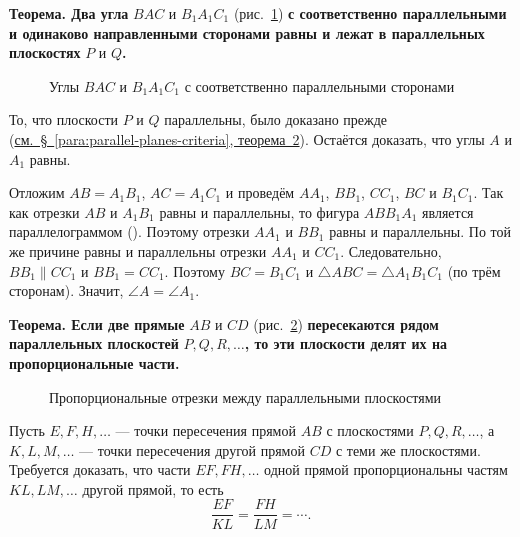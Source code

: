  \textbf{Теорема. Два угла} \(BAC\) и \(B_1A_1C_1\) (рис.~\ref{fig:kiselev-stereo-330}) \textbf{с соответственно параллельными и одинаково направленными сторонами равны и лежат в параллельных плоскостях} \(P\) и \(Q\)\textbf{.}

\begin{figure}[htbp]
    \centering
    \renewcommand{\thefigure}{330}
    \captionsetup{name=Рис.,labelsep=period}
    
    \caption{Углы \(BAC\) и \(B_1A_1C_1\) с соответственно параллельными сторонами}\label{fig:kiselev-stereo-330}
\end{figure}

То, что плоскости \(P\) и \(Q\) параллельны, было доказано прежде (\hyperref[thm:parallel-planes-two-lines]{см.~§~\ref*{para:parallel-planes-criteria}, теорема~2}). Остаётся доказать, что углы \(A\) и \(A_1\) равны.

Отложим \(AB=A_1B_1\), \(AC=A_1C_1\) и проведём \(AA_1\), \(BB_1\), \(CC_1\), \(BC\) и \(B_1C_1\). Так как отрезки \(AB\) и \(A_1B_1\) равны и параллельны, то фигура \(ABB_1A_1\) является параллелограммом (). Поэтому отрезки \(AA_1\) и \(BB_1\) равны и параллельны. По той же причине равны и параллельны отрезки \(AA_1\) и \(CC_1\). Следовательно, \(BB_1\parallel CC_1\) и \(BB_1=CC_1\). Поэтому \(BC=B_1C_1\) и \(\triangle ABC=\triangle A_1B_1C_1\) (по трём сторонам). Значит, \(\angle A=\angle A_1\).

 \textbf{Теорема. Если две прямые} \(AB\) и \(CD\) (рис.~\ref{fig:kiselev-stereo-331}) \textbf{пересекаются рядом параллельных плоскостей} \(P,Q,R,\ldots\)\textbf{, то эти плоскости делят их на пропорциональные части.}

\begin{figure}[htbp]
    \centering
    \renewcommand{\thefigure}{331}
    \captionsetup{name=Рис.,labelsep=period}
    
    \caption{Пропорциональные отрезки между параллельными плоскостями}\label{fig:kiselev-stereo-331}
\end{figure}

Пусть \(E,F,H,\ldots\) --- точки пересечения прямой \(AB\) с плоскостями \(P,Q,R,\ldots\), а \(K,L,M,\ldots\) --- точки пересечения другой прямой \(CD\) с теми же плоскостями. Требуется доказать, что части \(EF,FH,\ldots\) одной прямой пропорциональны частям \(KL,LM,\ldots\) другой прямой, то есть
\[
    \frac{EF}{KL}=\frac{FH}{LM}=\cdots.
\]

